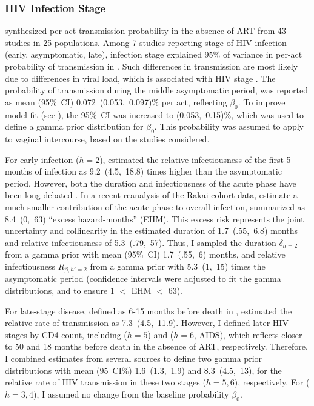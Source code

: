 \subsubsection{HIV Infection Stage}\label{model.par.beta.hiv}
\citet{Boily2009} synthesized per-act transmission probability in the absence of ART
from 43 studies in 25 populations.
Among 7 studies reporting stage of HIV infection (early, asymptomatic, late),
infection stage explained 95\% of variance
in per-act probability of transmission in \cite{Boily2009}.
Such differences in transmission are most likely due to differences in viral load,
which is associated with HIV stage \cite{Saag1996,Donnell2010}.
The probability of transmission during the middle asymptomatic period,
was reported as mean (95\%~CI) 0.072~(0.053,~0.097)\% per act, reflecting $\beta_0$.
To improve model fit (see ), the 95\%~CI was increased to (0.053,~0.15)\%,
which was used to define a gamma prior distribution for $\beta_0$.
This probability was assumed to apply to vaginal intercourse,
based on the studies considered.
\par
For early infection ($h=2$), \citet{Boily2009} estimated
the relative infectiousness of the first 5 months of infection
as 9.2~(4.5,~18.8) times higher than the asymptomatic period.
However, both the duration and infectiousness of the acute phase
have been long debated \cite{Hollingsworth2008,Cohen2011ahi,Cohen2012}.
In a recent reanalysis of the Rakai cohort data, \citet{Bellan2015} estimate
a much smaller contribution of the acute phase to overall infection,
summarized as 8.4~(0,~63) ``excess hazard-months'' (EHM).
This excess risk represents the joint uncertainty and collinearity in the estimated
duration of 1.7~(.55,~6.8) months and relative infectiousness of 5.3~(.79,~57).
Thus, I sampled the duration $\delta_{h=2}$ from
a gamma prior with mean (95\%~CI) 1.7~(.55,~6) months,
and relative infectiousness $R_{\beta,h'=2}$ from
a gamma prior with 5.3~(1,~15) times the asymptomatic period
(confidence intervals were adjusted to fit the gamma distributions, and to ensure 1 $<$ EHM $<$ 63).
\par
For late-stage disease, defined as 6-15 months before death in \cite{Boily2009},
\citeauthor{Boily2009} estimated the relative rate of transmission as 7.3~(4.5,~11.9).
However, I defined later HIV stages by CD4 count, including
 ($h=5$) and  ($h=6$, AIDS),
which reflects closer to 50 and 18 months before death in the absence of ART, respectively.
Therefore, I combined estimates from several sources
\cite{Wawer2005,Boily2009,Donnell2010} to define two gamma prior distributions
with mean (95~CI\%) 1.6~(1.3,~1.9) and 8.3~(4.5,~13),
for the relative rate of HIV transmission in these two stages ($h=5,6$), respectively.
For  ($h=3,4$), I assumed no change from the baseline probability $\beta_0$.
